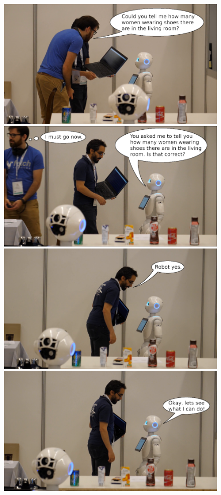 \begin{figure}[]
	\centering
	\includegraphics[width=.82\textwidth]{bilder/motivation/intro_1_edit.png}\\\vspace{3pt}
	\includegraphics[width=.82\textwidth]{bilder/motivation/intro_2_edit.png}\\\vspace{3pt}
	\includegraphics[width=.82\textwidth]{bilder/motivation/intro_3_edit.png}\\\vspace{3pt}
	\includegraphics[width=.82\textwidth]{bilder/motivation/intro_4_edit.png}\\\vspace{3pt}
	

\end{figure}
